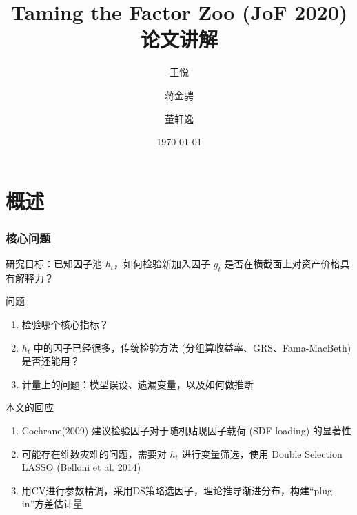 \documentclass[
  UTF8,
  xcolor={dvipsnames,rgb},
  hyperref={colorlinks, citecolor=orange, linkcolor=black},
  ]{beamer}
\title{Taming the Factor Zoo (JoF 2020) 论文讲解}
\date{\today}
\author{王悦 \and 蒋金骋 \and 董轩逸}
\institute{金融机器学习第一组}
\begin{document}
\begin{frame}
    \maketitle
\end{frame}

\begin{frame}
    \tableofcontents
\end{frame}

\section{概述}

\begin{frame}
    \frametitle{核心问题}

    \begin{wideitemize}
        \item 研究目标：已知因子池 \(h_{t}\)，如何检验新加入因子 \(g_{t}\) 是否在横截面上对资产价格具有解释力？
        \item 问题 \begin{enumerate}
            \item 检验哪个核心指标？
            \item \(h_{t}\) 中的因子已经很多，传统检验方法 (分组算收益率、GRS、Fama-MacBeth) 是否还能用？
            \item 计量上的问题：模型误设、遗漏变量，以及如何做推断
        \end{enumerate}
        \pause
        \item 本文的回应 \begin{enumerate}
            \item Cochrane(2009) 建议检验因子对于随机贴现因子载荷 (SDF loading) 的显著性
            \item 可能存在维数灾难的问题，需要对 \(h_{t}\) 进行变量筛选，使用 Double Selection LASSO (Belloni et al. 2014)
            \item 用CV进行参数精调，采用DS策略选因子，理论推导渐进分布，构建``plug-in''方差估计量
        \end{enumerate}
    \end{wideitemize}
\end{frame}
\end{document}
